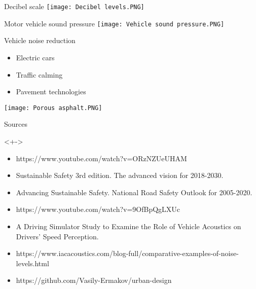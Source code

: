 \documentclass{beamer}
\begin{document}
    \begin{frame}{Decibel scale}
        \texttt{[image: Decibel levels.PNG]}
    \end{frame}

    \begin{frame}{Motor vehicle sound pressure}
        \texttt{[image: Vehicle sound pressure.PNG]}
    \end{frame}

    \begin{frame}{Vehicle noise reduction}
        \begin{block}{}
            \begin{itemize}
                \item Electric cars
                \item Traffic calming
                \item Pavement technologies
            \end{itemize}
            \texttt{[image: Porous asphalt.PNG]}
        \end{block}

    \end{frame}

    \begin{frame}{Sources}
        \begin{block}
            <+->{}
            \begin{itemize}
                \item https://www.youtube.com/watch?v=ORzNZUeUHAM
                \item Sustainable Safety 3rd edition. The advanced vision for 2018-2030.
                \item Advancing Sustainable Safety. National Road Safety Outlook for 2005-2020.
                \item https://www.youtube.com/watch?v=9OfBpQgLXUc
                \item A Driving Simulator Study to Examine the Role of Vehicle Acoustics on Drivers’ Speed Perception.
                \item https://www.iacacoustics.com/blog-full/comparative-examples-of-noise-levels.html
                \item https://github.com/Vasily-Ermakov/urban-design
            \end{itemize}
        \end{block}
    \end{frame}
\end{document}
